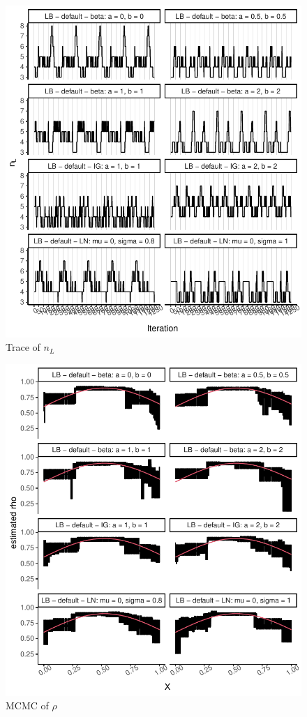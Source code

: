 \documentclass{amsart}
\begin{document}
\begin{figure}[ht]
	\centering
	\includegraphics[width=0.95\linewidth]{trace_nl_3.pdf}
	\caption{Trace of $n_L$}
	\label{fig:trace:nl:3}
\end{figure}
\iffalse
\begin{figure}[ht]
	\centering
	\includegraphics[width=0.95\linewidth]{mcmc_rho_3.pdf}
	\caption{MCMC of $\rho$}
	\label{fig:mcmc:rho:3}
\end{figure}
\end{document}
